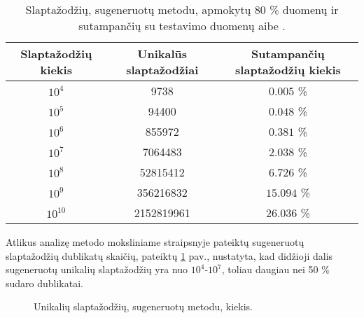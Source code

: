 \documentclass{VUMIFInfBakalaurinis}
\begin{document}
\begin{table}[hb]
  \centering
  \caption{
    Slaptažodžių, sugeneruotų  metodu, apmokytų 80 \% 
     duomenų ir sutampančių su  testavimo 
    duomenų aibe \cite{PassGAN}.
  }
  \begin{tabular}{|c|c|c|}
    \hline \textbf{Slaptažodžių kiekis} & \textbf{Unikalūs slaptažodžiai} & 
    \textbf{Sutampančių slaptažodžių kiekis} \\
    \hline $10^4$ & 9738 & $0.005$ \% \\
    \hline $10^5$ & 94400 & $0.048$ \% \\
    \hline $10^6$ & 855972 & $0.381$ \% \\
    \hline $10^7$ & 7064483 & $2.038$ \% \\
    \hline $10^8$ & 52815412 & $6.726$ \% \\
    \hline $10^9$ & 356216832 & $15.094$ \% \\
    \hline $10^{10}$ & 2152819961 & $26.036$ \% \\
    \hline
  \end{tabular}
  \label{tab:passgan-original-results}
\end{table}

Atlikus analizę  metodo moksliniame straipsnyje pateiktų 
sugeneruotų slaptažodžių dublikatų skaičių, pateiktų
\ref{plot:passgan-original-duplicates} pav., nustatyta, kad didžioji dalis 
sugeneruotų unikalių slaptažodžių yra nuo $10^4$-$10^7$, toliau daugiau nei 50 
\% sudaro dublikatai.

\begin{figure}[!ht]
  \begin{center}
  \end{center}
  \caption{
    Unikalių slaptažodžių, sugeneruotų  metodu, kiekis.
  }
  \label{plot:passgan-original-duplicates}
\end{figure}
\end{document}
